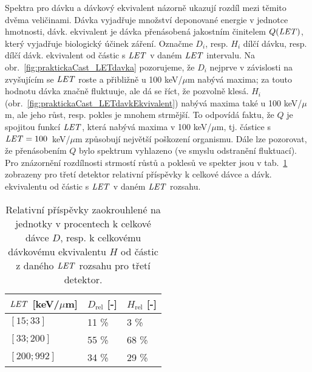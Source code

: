Spektra pro dávku a dávkový ekvivalent názorně ukazují rozdíl mezi těmito dvěma veličinami. Dávka vyjadřuje množství deponované energie v jednotce hmotnosti, dávk. ekvivalent je dávka přenásobená jakostním činitelem $Q(\mathit{LET})$, který vyjadřuje biologický účinek záření. Označme $D_i$, resp. $H_i$ dílčí dávku, resp. dílčí dávk. ekvivalent od částic s $\mathit{LET}$ v daném $\mathit{LET}$ intervalu. Na obr.~\ref{fig:praktickaCast_LETdavka} pozorujeme, že $D_i$ nejprve v závislosti na zvyšujícím se $\mathit{LET}$ roste a přibližně u 100 keV/$\mu$m nabývá maxima; za touto hodnotu dávka značně fluktuuje, ale dá se říct, že pozvolně klesá. $H_i$ (obr.~\ref{fig:praktickaCast_LETdavkEkvivalent}) nabývá maxima také u 100 keV/$\mu$m, ale jeho růst, resp. pokles je mnohem strmější. To odpovídá faktu, že $Q$ je spojitou funkcí $\mathit{LET}$,
která nabývá maxima v 100 keV/$\mu$m, tj. částice s $\mathit{LET}=\nobreak100$~keV/$\mu$m způsobují největší poškození organismu. Dále lze pozorovat, že přenásobením $Q$ bylo spektrum vyhlazeno (ve smyslu odstranění fluktuací). Pro znázornění rozdílnosti strmostí růstů a poklesů ve spekter jsou v tab.~\ref{tab:praktickaCast_relPrispevkyDavka} zobrazeny pro třetí detektor relativní příspěvky k celkové dávce a dávk. ekvivalentu od částic s $\mathit{LET}$ v daném $\mathit{LET}$ rozsahu.
\begin{table}[ht]
  \centering
  \caption{Relativní příspěvky zaokrouhlené na jednotky v procentech k celkové dávce $D$, resp. k celkovému dávkovému ekvivalentu $H$ od částic z daného $\mathit{LET}$ rozsahu pro třetí detektor.}
  \label{tab:praktickaCast_relPrispevkyDavka}
  \begin{tabular}{lll}
	\toprule
	$\mathit{LET}$ [keV/$\mu$m]& $D_{\text{rel}}$ [-]&$H_{\text{rel}}$ [-]\\
	\midrule
	$[15;33]$&11 \%&3 \%\\
	$[33;200]$&55 \%&68 \%\\
	$[200;992]$&34 \%&29 \%\\
	\bottomrule
  \end{tabular}
\end{table}

